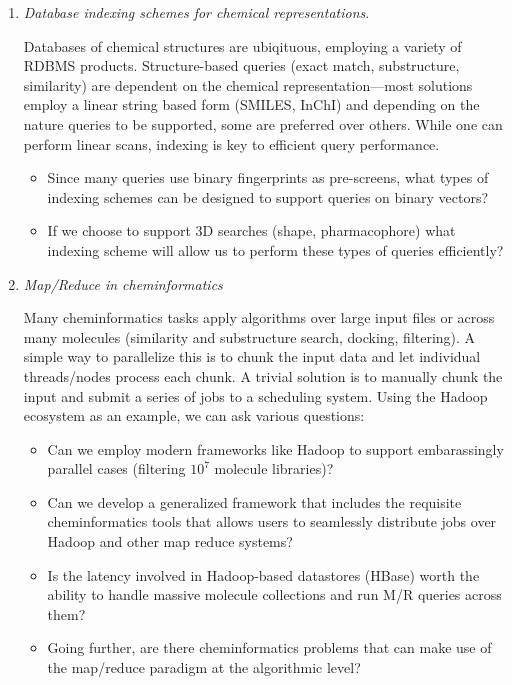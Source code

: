 \documentclass{sig-alternate}
\begin{document}
\begin{enumerate}
\item \emph{Database indexing schemes for chemical representations}.

Databases of chemical structures are ubiqituous, employing a variety
of RDBMS products. Structure-based queries (exact match, substructure,
similarity) are dependent on the chemical representation---most
solutions employ a linear string based form (SMILES, InChI) and
depending on the nature queries to be supported, some are preferred
over others. While one can perform linear scans, indexing is key to
efficient query performance.
\begin{itemize}
\item  Since many queries use binary fingerprints as pre-screens, what
  types of indexing schemes can be designed to support queries on
  binary vectors?
\item If we choose to support 3D searches (shape, pharmacophore) what
  indexing scheme will allow us to perform these types of queries
  efficiently?
\end{itemize}

\item \emph{Map/Reduce in cheminformatics}

  Many cheminformatics tasks apply algorithms over large input files
  or across many molecules (similarity and substructure search,
  docking, filtering). A simple way to parallelize this is to chunk
  the input data and let individual threads/nodes process each chunk. A
  trivial solution is to manually chunk the input and submit a series
  of jobs to a scheduling system. Using the Hadoop ecosystem as an
  example, we can ask various questions:
  \begin{itemize}
  \item Can we employ modern frameworks like Hadoop to support
    embarassingly parallel cases (filtering $10^7$ molecule libraries)?
  \item Can we develop a generalized framework that includes the
    requisite cheminformatics tools that allows users to seamlessly
    distribute jobs over Hadoop and other map reduce systems?
  \item Is the latency involved in Hadoop-based datastores (HBase)
    worth the ability to handle massive molecule collections and run
    M/R queries across them?
  \item Going further, are there cheminformatics problems that can make use
  of the map/reduce paradigm at the algorithmic level?
  \end{itemize}
\end{enumerate}
\end{document}

